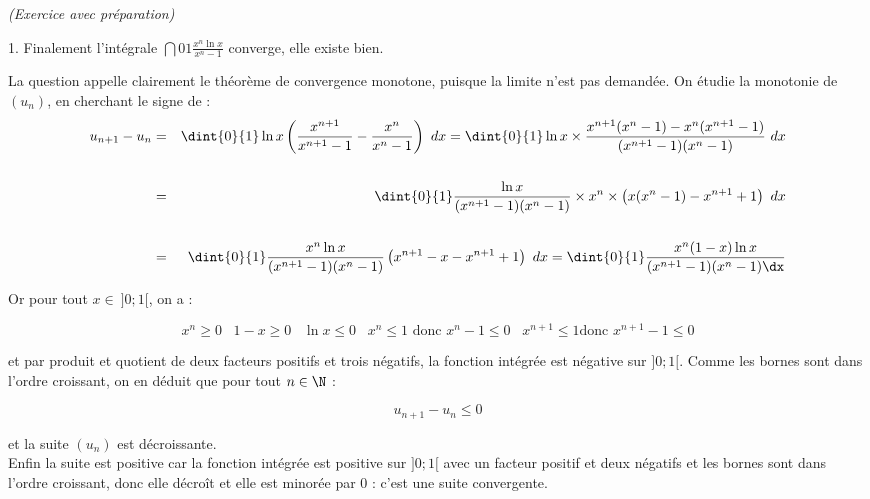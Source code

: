 \documentclass[11pt]{article}%
\begin{document}
\begin{exercice}{\it (Exercice avec préparation)}
\begin{noliste}{1.}
 Finalement l'intégrale $\dint{0}{1} \frac{ x^{n} \ln x }{ x^{n} - 1 }
$ converge, elle existe bien. \\

\item La question appelle clairement le théorème de convergence
  monotone, puisque la limite n'est pas demandée. On étudie la
  monotonie de $(u_{n})$, en cherchant le signe de :
  \begin{eqnarray*}
    u_{n + 1} - u_{n} & = & \dint{0}{1} \ln x \left( \frac{ x^{n + 1} }{
        x^{n + 1} - 1 } - \frac{ x^{n} }{ x^{n} - 1 } \right) \ dx =
    \dint{0}{1} \ln x \times \frac{ x^{n + 1} (x^{n} - 1 ) - x^{n} (x^{n +
        1} - 1 ) }{ (x^{n + 1} - 1 ) ( x^{n} - 1 ) } \ dx \\
    \\
    & = & \dint{0}{1} \frac{ \ln x }{ (x^{n + 1} - 1 ) ( x^{n} - 1 ) }
    \times x^{n} \times \left( x ( x^{n} - 1 ) - x^{n +
        1} + 1 \right) \ dx \\
    \\
    & = & \dint{0}{1} \frac{x^{n} \ln x }{ (x^{n + 1} - 1 ) ( x^{n} - 1 )
    } \left( x^{ n + 1 } - x - x^{n + 1} + 1 \right) \ dx
    = \dint{0}{1} \frac{ x^{n} (1-x) \ln x }{ (x^{n + 1} - 1 ) ( x^{n} - 1
      ) \dx}
 \end{eqnarray*}


 Or pour tout $x \in \ ] 0 ; 1[$, on a : 
 
\[
 x^{n} \geq 0 \ \, \ \ 1-x \geq 0 \ \, \ \ \ln x \leq 0 \ \, \ \ x^{n}
\leq 1 \text{ donc } x^{n} - 1 \leq 0 \ \, \ \ x^{n + 1} \leq 1 \text{
donc } x^{n + 1} - 1 \leq 0 
\]

 et par produit et quotient de deux facteurs positifs et trois
négatifs, la fonction intégrée est négative sur $]0;1[$. Comme les
bornes sont dans l'ordre croissant, on en déduit que pour tout $n \in
\N$ : 
 
\[
 u_{n + 1} - u_{n} \leq 0 
\]

 et la suite $(u_{n})$ est décroissante. \\

 Enfin la suite est positive car la fonction intégrée est positive sur
$]0 ; 1[$ avec un facteur positif et deux négatifs et les bornes sont
dans l'ordre croissant, donc elle décroît et elle est minorée par 0 :
c'est une suite convergente.

 \end{noliste}
 \end{exercice}
\end{document}

